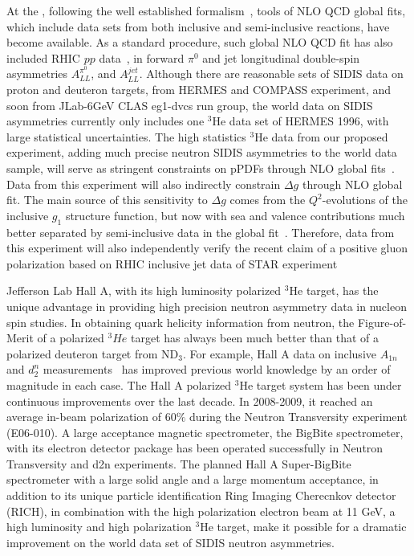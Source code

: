 At the \nloo, following the well established formalism~\cite{DSSV2008},
tools of NLO QCD global fits, which include data sets from both inclusive and semi-inclusive reactions,
have become available.   As a standard procedure,  such global NLO QCD fit
has also included RHIC $pp$ data~\cite{DSSVplusplus}, in forward $\pi^0$ and jet longitudinal double-spin asymmetries $A_{LL}^{\pi^0}$, and $A_{LL}^{jet}$. 
Although there are reasonable  sets of SIDIS  data on proton and deuteron targets, from HERMES and COMPASS experiment, and soon from JLab-6GeV CLAS eg1-dvcs run group,  the world data on SIDIS asymmetries  currently only includes
one $^3$He data set of HERMES 1996, with large statistical uncertainties.
The high statistics $^3$He data from our proposed experiment, adding much precise
 neutron SIDIS asymmetries to the world data sample,  
will serve as stringent constraints on pPDFs through NLO global fits~\cite{epjcxj2006}. 
Data from this experiment  will also  indirectly constrain  $\Delta g$   through NLO global fit. 
The main source of this sensitivity to $\Delta g$ comes from 
the $Q^2$-evolutions of the inclusive $g_1$ structure function, but now with 
 sea and valence contributions much better
 separated by semi-inclusive data in the global fit~\cite{DSSV2008,epjcxj2006}.
Therefore,  data from this experiment will  also independently verify 
the recent claim of a positive gluon polarization based on RHIC inclusive jet data of STAR experiment~\cite{Adamczyk:2014ozi} 

Jefferson Lab Hall A, with its high luminosity polarized $^3$He target, has the unique
advantage in providing high precision neutron asymmetry data in nucleon spin studies. 
In obtaining quark helicity information from neutron,  the Figure-of-Merit of  a polarized $^3He$ target has always been much better than  that of a polarized deuteron target from ND$_3$.
For example, Hall A data on inclusive  $A_{1n}$ and $d_2^n$ measurements~\cite{A1N_PR}
has improved previous world knowledge by an order of magnitude in each case. 
The Hall A polarized $^3$He target system has been under continuous improvements over 
the last decade.  In 2008-2009, it reached an average in-beam polarization of 60$\%$  
during the Neutron Transversity experiment (E06-010).
A large acceptance magnetic spectrometer, the BigBite spectrometer, with its electron detector package
has been operated successfully in Neutron Transversity and d2n experiments. 
The planned Hall A Super-BigBite spectrometer with  a large solid angle and a large momentum acceptance, in addition to its unique particle identification Ring Imaging Cherecnkov  detector (RICH), 
in  combination with the high polarization electron beam at 11 GeV, 
a high luminosity and high polarization $^3$He target,  make it possible for a dramatic improvement on the world data set of 
SIDIS neutron asymmetries.



